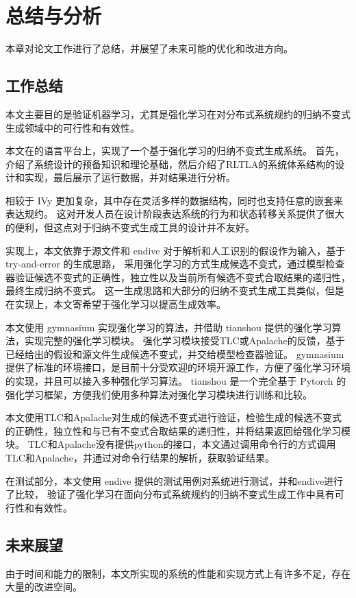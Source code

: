 \chapter{总结与分析}\label{chap:conclusion}
本章对论文工作进行了总结，并展望了未来可能的优化和改进方向。
\section{工作总结}
本文主要目的是验证机器学习，尤其是强化学习在对分布式系统规约的归纳不变式生成领域中的可行性和有效性。

本文在\TLA 的语言平台上，实现了一个基于强化学习的归纳不变式生成系统。
首先，介绍了系统设计的预备知识和理论基础，然后介绍了RLTLA的系统体系结构的设计和实现，最后展示了运行数据，并对结果进行分析。

\TLA 相较于 IVy 更加复杂，其中存在灵活多样的数据结构，同时也支持任意的嵌套来表达规约。
这对开发人员在设计阶段表达系统的行为和状态转移关系提供了很大的便利，但这点对于归纳不变式生成工具的设计并不友好。

实现上，本文依靠于\TLA 源文件和 endive 对于\TLA 解析和人工识别的假设作为输入，基于 try-and-error 的生成思路，
采用强化学习的方式生成候选不变式，通过模型检查器验证候选不变式的正确性，独立性以及当前所有候选不变式合取结果的递归性，最终生成归纳不变式。
这一生成思路和大部分的归纳不变式生成工具类似，但是在实现上，本文寄希望于强化学习以提高生成效率。

本文使用 gymnasium 实现强化学习的算法，并借助 tianshou 提供的强化学习算法，实现完整的强化学习模块。
强化学习模块接受TLC或Apalache的反馈，基于已经给出的假设和\TLA 源文件生成候选不变式，并交给模型检查器验证。
gymnasium 提供了标准的环境接口，是目前十分受欢迎的环境开源工作，方便了强化学习环境的实现，并且可以接入多种强化学习算法。
tianshou 是一个完全基于 Pytorch 的强化学习框架，方便我们使用多种算法对强化学习模块进行训练和比较。

本文使用TLC和Apalache对生成的候选不变式进行验证，检验生成的候选不变式的正确性，独立性和与已有不变式合取结果的递归性，并将结果返回给强化学习模块。
TLC和Apalache没有提供python的接口，本文通过调用命令行的方式调用TLC和Apalache，并通过对命令行结果的解析，获取验证结果。

在测试部分，本文使用 endive 提供的测试用例对系统进行测试，并和endive进行了比较，
验证了强化学习在面向分布式系统规约的归纳不变式生成工作中具有可行性和有效性。

\section{未来展望}
由于时间和能力的限制，本文所实现的系统的性能和实现方式上有许多不足，存在大量的改进空间。

